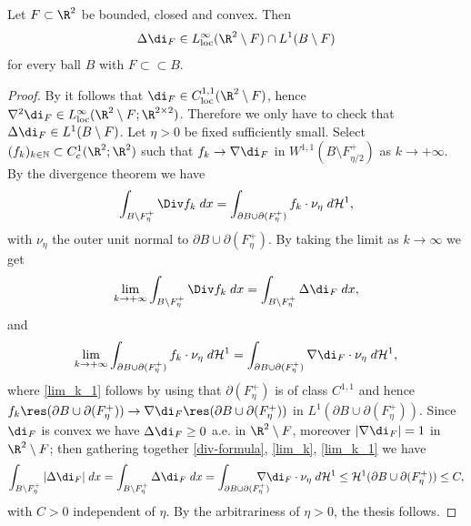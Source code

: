 \begin{lemma}\label{lem:prop_distanza_da_convesso}
Let $F\subset\R^2$ be bounded, closed and convex.
Then
\[
\Delta\di_F\in L^{\infty}_\mathrm{loc}(\R^2\setminus F)\cap L^1(B\setminus F)
\]
for every ball $B$ with $F\subset\subset B$.
\end{lemma}
\begin{proof}
By \cite[Th.\,3.6.7, p.\,75]{Can-Sin} it follows that $\di_F\in C^{1,1}_\mathrm{loc}(\R^2\setminus F)$, hence $\nabla^2\di_F\in L^{\infty}_\mathrm{loc}(\R^2\setminus F;\R^{2\times 2})$.
Therefore we only have to check that $\Delta\di_F\in L^1(B\setminus F)$.
Let $\eta>0$ be fixed sufficiently small.
Select $(f_k)_{k\in\mathbb{N}}\subset C^1_c(\R^2; \R^2)$ such that
$f_k\to \nabla\di_F$ in $W^{1,1}(B
\setminus F_{\eta/2}^+)$ as $k\to+\infty$.
By the divergence theorem we have
\begin{equation}\label{div-formula}
\int_{B\setminus F^+_\eta}\Div f_k\;dx=\int_{
\partial B\cup\partial (F^+_\eta)}f_k\cdot\nu_\eta \;d\mathcal{H}^1,
\end{equation}
with $\nu_\eta$ the outer unit normal to $\partial B\cup\partial (F^+_\eta)$.
By taking the limit as $k\to \infty$ we get
\begin{equation}\label{lim_k}
\lim_{k\to+\infty} \int_{B\setminus F^+_\eta}\Div f_k\;dx=\int_{B\setminus F^+_\eta}\Delta\di_F \;dx,
\end{equation}
and
\begin{equation}\label{lim_k_1}
\lim_{k\to+\infty} \int_{\partial B\cup\partial (F^+_\eta)}f_k\cdot\nu_\eta\; d\mathcal{H}^1= \int_{\partial B\cup\partial (F^+_\eta)}\nabla\di_F\cdot\nu_\eta\; d\mathcal{H}^1,
\end{equation}
where \eqref{lim_k_1} follows by using that $\partial(F^+_\eta)$ is of class $C^{1,1}$ and hence $f_k\res(\partial B\cup\partial (F^+_\eta))\to\nabla\di_F\res(\partial B\cup\partial (F^+_\eta))$
in $L^1(\partial B\cup\partial (F^+_\eta))$.
Since $\di_F$ is convex we have $\Delta\di_F\ge0$ a.e. in $\R^2\setminus F$, moreover
$|\nabla\di_F|=1$ in $\R^2\setminus F$; then gathering together \eqref{div-formula}, \eqref{lim_k}, \eqref{lim_k_1} we have
\begin{equation*}
\int_{B\setminus F^+_\eta}|\Delta\di_F|\; dx=
\int_{B\setminus F^+_\eta}\Delta\di_F \;dx=
\int_{\partial B\cup\partial (F^+_\eta)}\!\!\!\!\!\!\!\!\nabla\di_F\cdot\nu_\eta \;d\mathcal{H}^1\le \mathcal{H}^1(\partial B\cup\partial(F^+_\eta))\le C,
\end{equation*}
with $C>0$ independent of $\eta$.
By the arbitrariness of $\eta>0$, the thesis follows.
\end{proof}
